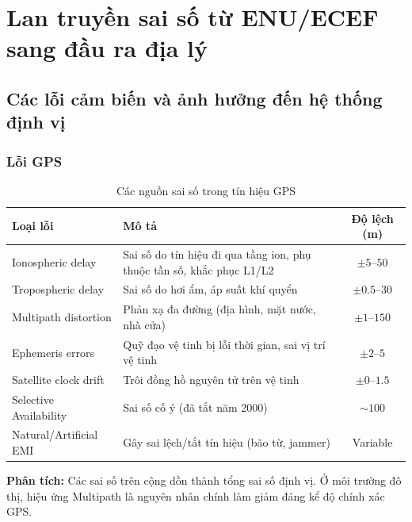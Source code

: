 \section{Lan truyền sai số từ ENU/ECEF sang đầu ra địa lý}
\subsection{Các lỗi cảm biến và ảnh hưởng đến hệ thống định vị}
\subsubsection{Lỗi GPS} 
\begin{table}[h!]
\centering
\begin{tabular}{|l|p{7cm}|c|}
\hline
\textbf{Loại lỗi} & \textbf{Mô tả} & \textbf{Độ lệch (m)} \\
\hline
Ionospheric delay & Sai số do tín hiệu đi qua tầng ion, phụ thuộc tần số, khắc phục L1/L2 & $\pm 5$--$50$ \\
\hline
Tropospheric delay & Sai số do hơi ẩm, áp suất khí quyển & $\pm 0.5$--$30$ \\
\hline
Multipath distortion & Phản xạ đa đường (địa hình, mặt nước, nhà cửa) & $\pm 1$--$150$ \\
\hline
Ephemeris errors & Quỹ đạo vệ tinh bị lỗi thời gian, sai vị trí vệ tinh & $\pm 2$--$5$ \\
\hline
Satellite clock drift & Trôi đồng hồ nguyên tử trên vệ tinh & $\pm 0$--$1.5$ \\
\hline
Selective Availability & Sai số cố ý (đã tắt năm 2000) & $\sim 100$ \\
\hline
Natural/Artificial EMI & Gây sai lệch/tắt tín hiệu (bão từ, jammer) & Variable \\
\hline
\end{tabular}
\caption{Các nguồn sai số trong tín hiệu GPS}
\end{table}


\noindent\textbf{Phân tích:} Các sai số trên cộng dồn thành tổng sai số định vị. Ở môi trường đô thị, hiệu ứng Multipath là nguyên nhân chính làm giảm đáng kể độ chính xác GPS.

